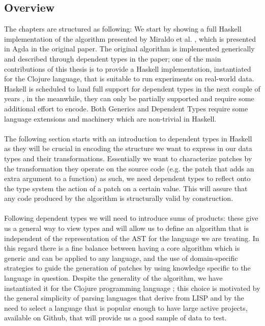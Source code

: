 \documentclass[11pt, titlepage]{article}
\begin{document}
\subsection{Overview}\label{overview}
The chapters are structured as following: 
We start by showing a full Haskell implementation of the algorithm presented by Miraldo et al. \cite{type-directed-diff}, which is presented in Agda in the original paper. 
The original algorithm is implemented generically and described through dependent types in the paper; one of the main contributions of this thesis is to provide a Haskell implementation, instantiated for the Clojure language, that is suitable to run experiments on real-world data. 
Haskell is scheduled to land full support for dependent types in the next couple of years \cite{dependent-haskell}, in the meanwhile, they can only be partially supported and require some additional effort to encode.
Both Generics and Dependent Types require some language extensions and machinery which are non-trivial in Haskell.
\\
\\
The following section starts with an introduction to dependent types in Haskell as they will be crucial in encoding the structure we want to express in our data types and their transformations. 
Essentially we want to characterize patches by the transformation they operate on the source code (e.g. the patch that adds an extra argument to a function) as such, we need dependent types to reflect onto the type system the action of a patch on a certain value. This will assure that any code produced by the algorithm is structurally valid by construction.
\\
\\
Following dependent types we will need to introduce sums of products: these give us a general way to view types and will allow us to define an algorithm that is independent of the representation of the AST for the language we are treating. In this regard there is a fine balance between having a core algorithm which is generic and can be applied to any language, and the use of domain-specific strategies to guide the generation of patches by using knowledge specific to the language in question.
Despite the generality of the algorithm, we have instantiated it for the Clojure programming language \cite{clojure}; this choice is motivated by the general simplicity of parsing languages that derive from LISP and by the need to select a language that is popular enough to have large 
active projects, available on Github, that will provide us a good sample of data to test.
\end{document}

